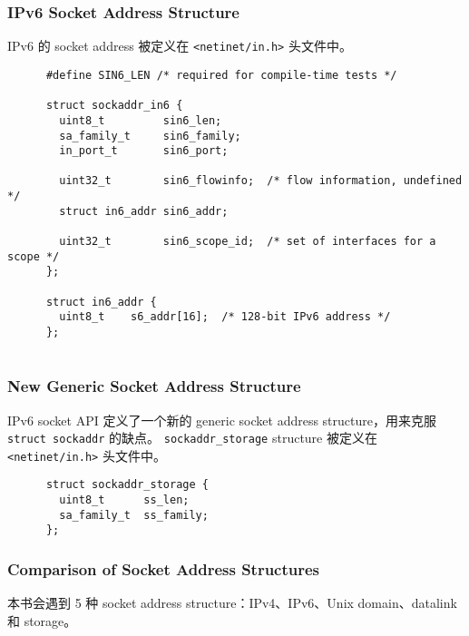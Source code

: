     \subsubsection{IPv6 Socket Address Structure}

      IPv6 的 socket address 被定义在 \texttt{<netinet/in.h>} 头文件中。

      \begin{verbatim}
      #define SIN6_LEN /* required for compile-time tests */

      struct sockaddr_in6 {
        uint8_t         sin6_len;
        sa_family_t     sin6_family;
        in_port_t       sin6_port;

        uint32_t        sin6_flowinfo;  /* flow information, undefined */
        struct in6_addr sin6_addr;

        uint32_t        sin6_scope_id;  /* set of interfaces for a scope */
      };

      struct in6_addr {
        uint8_t    s6_addr[16];  /* 128-bit IPv6 address */
      };
        
      \end{verbatim}

    \subsubsection{New Generic Socket Address Structure}

      IPv6 socket API 定义了一个新的 generic socket address structure，用来克服 \texttt{struct sockaddr} 的缺点。
      \texttt{sockaddr\_storage} structure 被定义在 \texttt{<netinet/in.h>} 头文件中。

      \begin{verbatim}
      struct sockaddr_storage {
        uint8_t      ss_len;
        sa_family_t  ss_family;
      };
      \end{verbatim}

    \subsubsection{Comparison of Socket Address Structures}

      本书会遇到 5 种 socket address structure：IPv4、IPv6、Unix domain、datalink 和 storage。
